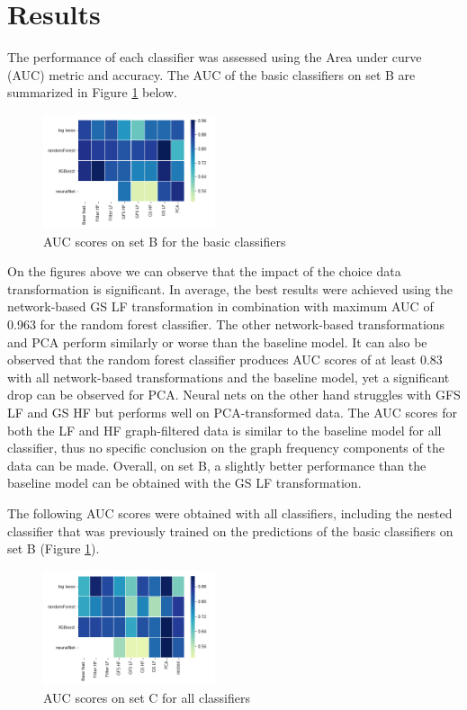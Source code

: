 \documentclass[10pt,conference,compsocconf]{IEEEtran}
\begin{document}
\section*{Results}

The performance of each classifier was assessed using the Area under curve (AUC) metric and accuracy.
The AUC of the basic classifiers on set B are summarized in Figure \ref{fig:train_acc} below.
\begin{figure}[H]
	\centering
	\includegraphics[width=0.45\textwidth]{train_auc.png}
	\caption{AUC scores on set B for the basic classifiers}
	\label{fig:train_acc}
\end{figure}
On the figures above we can observe that the impact of the choice data transformation is significant.
In average, the best results were achieved using the network-based GS LF transformation in combination  with maximum AUC of 0.963 for the random forest classifier. The other network-based transformations and PCA perform similarly or worse than the baseline model. It can also be observed that the random forest classifier produces AUC scores of at least 0.83 with all network-based transformations and the baseline model, yet a significant drop can be observed for PCA. Neural nets on the other hand struggles with GFS LF and GS HF but performs well on PCA-transformed data. The AUC scores for both the LF and HF graph-filtered data is similar to the baseline model for all classifier, thus no specific conclusion on the graph frequency components of the data can be made. Overall, on set B, a slightly better performance than the baseline model can be obtained with the GS LF transformation.
\par  
The following AUC scores were obtained with all classifiers, including the nested classifier that was previously trained on the predictions of the basic classifiers on set B (Figure \ref{fig:train_acc}).

\begin{figure}[H]
	\centering
	\includegraphics[width=0.45\textwidth]{test_auc.png}
	\caption{AUC scores on set C for all classifiers }
	\label{fig:test_acc}
\end{figure}
\end{document}
